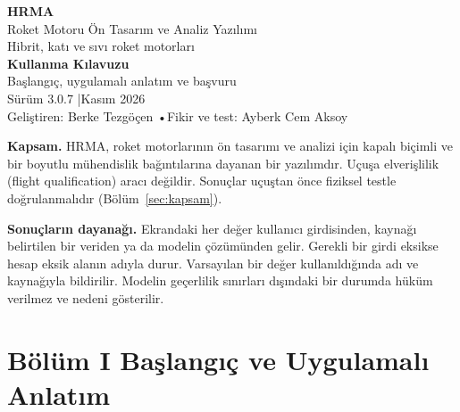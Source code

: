 \documentclass[11pt,a4paper]{article}
\begin{document}
\shorthandoff{=:!}

\begin{titlepage}
\centering
\vspace*{2.5cm}
{\fontsize{54}{60}\selectfont\bfseries\color{hrmadark}HRMA}\\[4pt]
{\Large\color{hrmacyan}Roket Motoru Ön Tasarım ve Analiz Yazılımı}\\[6pt]
{\large\color{hrmagray}Hibrit, katı ve sıvı roket motorları}\\[2.2cm]

{\Huge\bfseries\color{hrmadark}Kullanma Kılavuzu}\\[10pt]
{\large\color{hrmagray}Başlangıç, uygulamalı anlatım ve başvuru}\\[3cm]

{\large Sürüm 3.0.7 \quad|\quad Kasım 2026}\\[6pt]
{\small\color{hrmagray}Geliştiren: Berke Tezgöçen \quad•\quad Fikir ve test: Ayberk Cem Aksoy}\\[1.5cm]

\begin{notkutu}
\small\color{hrmadark}
\textbf{Kapsam.} HRMA, roket motorlarının ön tasarımı ve analizi için
kapalı biçimli ve bir boyutlu mühendislik bağıntılarına dayanan bir
yazılımdır. Uçuşa elverişlilik (flight qualification) aracı değildir.
Sonuçlar uçuştan önce fiziksel testle doğrulanmalıdır (Bölüm~\ref{sec:kapsam}).

\medskip
\textbf{Sonuçların dayanağı.} Ekrandaki her değer kullanıcı girdisinden,
kaynağı belirtilen bir veriden ya da modelin çözümünden gelir. Gerekli bir
girdi eksikse hesap eksik alanın adıyla durur. Varsayılan bir değer
kullanıldığında adı ve kaynağıyla bildirilir. Modelin geçerlilik sınırları
dışındaki bir durumda hüküm verilmez ve nedeni gösterilir.
\end{notkutu}
\end{titlepage}

\tableofcontents
\newpage
\listoffigures
\listoftables
\newpage

\part*{Bölüm I \quad Başlangıç ve Uygulamalı Anlatım}
\end{document}
